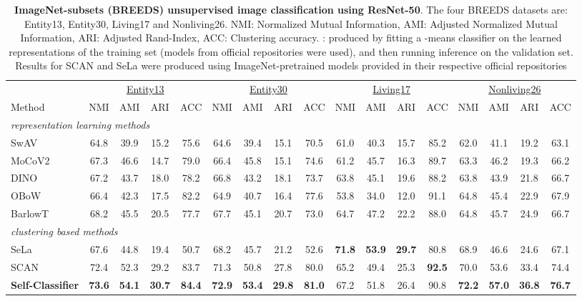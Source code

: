 \documentclass[runningheads]{llncs}
\begin{document}
\begin{table*}[bt]
  \centering
  \tiny
\caption{\textbf{ImageNet-subsets (BREEDS) unsupervised image classification using ResNet-50}. The four BREEDS datasets are: Entity13, Entity30, Living17 and Nonliving26. NMI: Normalized Mutual Information, AMI: Adjusted Normalized Mutual Information, ARI: Adjusted Rand-Index, ACC: Clustering accuracy. : produced by fitting a -means classifier on the learned representations of the training set (models from official repositories were used), and then running inference on the validation set. Results for SCAN and SeLa were produced using ImageNet-pretrained models provided in their respective official repositories}
  \label{table:unsupervised_image_classification_breeds}
  \begin{tabular}{lcccc|cccc|cccc|cccc}
    \toprule
     & \multicolumn{4}{c}{\underline{Entity13}} & \multicolumn{4}{c}{\underline{Entity30}} & \multicolumn{4}{c}{\underline{Living17}} & \multicolumn{4}{c}{\underline{Nonliving26}}\\
    Method & NMI & AMI & ARI & ACC & NMI & AMI & ARI & ACC & NMI & AMI & ARI & ACC & NMI & AMI & ARI & ACC \\
    \midrule
    \multicolumn{17}{l}{\textit{representation learning methods}}\\
    SwAV \cite{caron2020unsupervised} & 64.8 & 39.9 & 15.2 & 75.6 & 64.6 & 39.4 & 15.1 & 70.5 & 61.0 & 40.3 & 15.7 & 85.2 & 62.0 & 41.1 & 19.2 & 63.1 \\
    MoCoV2 \cite{chen2020improved} & 67.3 & 46.6 & 14.7 & 79.0 & 66.4 & 45.8 & 15.1 & 74.6 & 61.2 & 45.7 & 16.3 & 89.7 & 63.3 & 46.2 & 19.3 & 66.2 \\
    DINO \cite{caron2021emerging} & 67.2 & 43.7 & 18.0 & 78.2 & 66.8 & 43.2 & 18.1 & 73.7 & 63.8 & 45.1 & 19.6 & 88.2 & 63.8 & 43.9 & 21.8 & 66.7 \\
    OBoW \cite{gidaris2021obow} & 66.4 & 42.3 & 17.5 & 82.2 & 64.9 & 40.7 & 16.4 & 77.6 & 53.8 & 34.0 & 12.0 & 91.1 & 64.8 & 45.4 & 22.9 & 67.9 \\
    BarlowT \cite{DBLP:conf/icml/ZbontarJMLD21} & 68.2 & 45.5 & 20.5 & 77.7 & 67.7 & 45.1 & 20.7 & 73.0 & 64.7 & 47.2 & 22.2 & 88.0 & 64.8 & 45.7 & 24.9 & 66.7 \\
    \midrule
    \midrule
    \multicolumn{17}{l}{\textit{clustering based methods}}\\
    SeLa \cite{YM.2020Self-labelling} & 67.6 & 44.8 & 19.4 & 50.7 & 68.2 & 45.7 & 21.2 & 52.6 & \textbf{71.8} & \textbf{53.9} & \textbf{29.7} & 80.8 & 68.9 & 46.6 & 24.6 & 67.1 \\
    SCAN \cite{van2020scan} & 72.4 & 52.3 & 29.2 & 83.7 & 71.3 & 50.8 & 27.8 & 80.0 & 65.2 & 49.4 & 25.3 & \textbf{92.5} & 70.0 & 53.6 & 33.4 & 74.4 \\
    \midrule
        \textbf{Self-Classifier} & \textbf{73.6} & \textbf{54.1} & \textbf{30.7} & \textbf{84.4} & \textbf{72.9} & \textbf{53.4} & \textbf{29.8} & \textbf{81.0} & 67.2 & 51.8 & 26.4 & 90.8 & \textbf{72.2} & \textbf{57.0} & \textbf{36.8} & \textbf{76.7} \\
    \bottomrule
  \end{tabular}
\end{table*}
\end{document}
